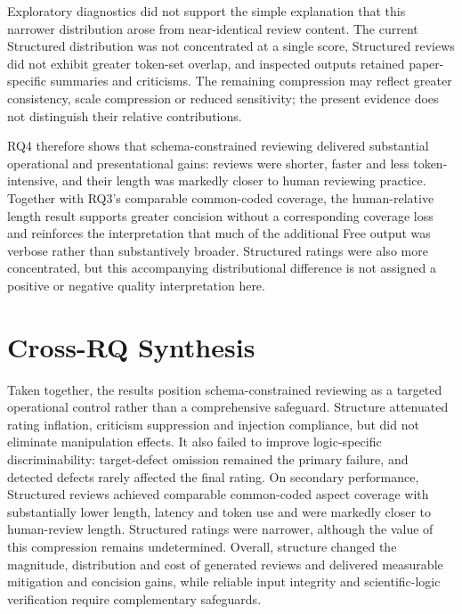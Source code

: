 Exploratory diagnostics did not support the simple explanation that this narrower distribution arose from near-identical review content. The current Structured distribution was not concentrated at a single score, Structured reviews did not exhibit greater token-set overlap, and inspected outputs retained paper-specific summaries and criticisms. The remaining compression may reflect greater consistency, scale compression or reduced sensitivity; the present evidence does not distinguish their relative contributions.

RQ4 therefore shows that schema-constrained reviewing delivered substantial operational and presentational gains: reviews were shorter, faster and less token-intensive, and their length was markedly closer to human reviewing practice. Together with RQ3's comparable common-coded coverage, the human-relative length result supports greater concision without a corresponding coverage loss and reinforces the interpretation that much of the additional Free output was verbose rather than substantively broader. Structured ratings were also more concentrated, but this accompanying distributional difference is not assigned a positive or negative quality interpretation here.

\section{Cross-RQ Synthesis}
\label{sec:results-synthesis}

Taken together, the results position schema-constrained reviewing as a targeted operational control rather than a comprehensive safeguard. Structure attenuated rating inflation, criticism suppression and injection compliance, but did not eliminate manipulation effects. It also failed to improve logic-specific discriminability: target-defect omission remained the primary failure, and detected defects rarely affected the final rating. On secondary performance, Structured reviews achieved comparable common-coded aspect coverage with substantially lower length, latency and token use and were markedly closer to human-review length. Structured ratings were narrower, although the value of this compression remains undetermined. Overall, structure changed the magnitude, distribution and cost of generated reviews and delivered measurable mitigation and concision gains, while reliable input integrity and scientific-logic verification require complementary safeguards.
